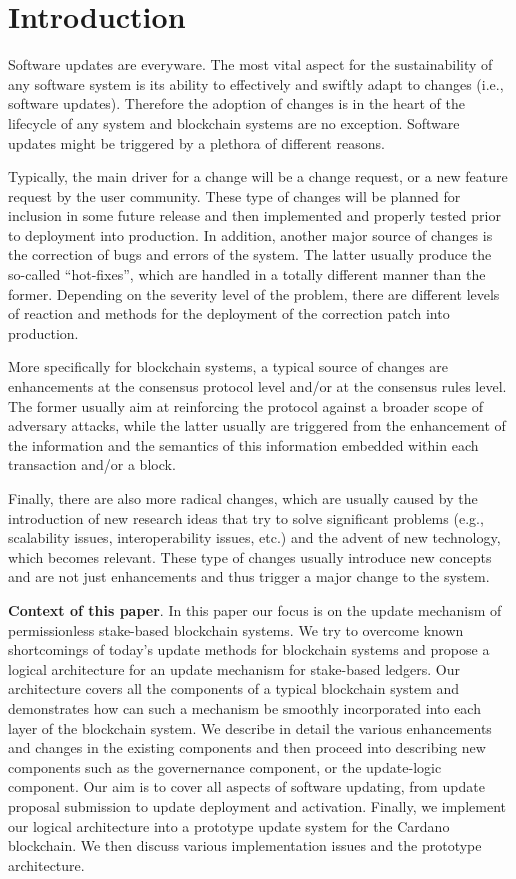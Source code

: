 \section{Introduction}
Software updates are everyware. The most vital aspect for the sustainability of any software system is its ability to effectively and swiftly adapt to changes (i.e., software updates). Therefore the adoption of changes is in the heart of the lifecycle of any system and blockchain systems are no exception. Software updates might be triggered by a plethora of different reasons. 

Typically, the main driver for a change will be a change request, or a new feature request by the user community. These type of changes will be planned for inclusion in some future release and then implemented and properly tested prior to deployment into production. In addition, another major source of changes is the correction of bugs and errors of the system. The latter usually produce the so-called \enquote{hot-fixes}, which are handled in a totally different manner than the former. Depending on the severity level of the problem, there are different levels of reaction and methods for the deployment of the correction patch into production. 

More specifically for blockchain systems, a typical source of changes are enhancements at the consensus protocol level and/or at the consensus rules level. The former usually aim at reinforcing the protocol against a broader scope of adversary attacks, while the latter usually are triggered from the enhancement of the information and the semantics of this information embedded within each transaction and/or a block. 

Finally, there are also more radical changes, which are usually caused by the introduction of new research ideas that try to solve significant problems (e.g., scalability issues, interoperability issues, etc.) and the advent of new technology, which becomes relevant. These type of changes usually introduce new concepts and are not just enhancements and thus trigger a major change to the system.

\noindent\textbf{Context of this paper}. In this paper our focus is on the update mechanism of permissionless stake-based blockchain systems. We try to overcome known shortcomings of today's update methods for blockchain systems and propose a logical architecture for an update mechanism for stake-based ledgers. Our architecture covers all the components of a typical blockchain system and demonstrates how can such a mechanism be smoothly incorporated into each layer of the blockchain system. We describe in detail the various enhancements and changes in the existing components and then proceed into describing new components such as the governernance component, or the update-logic component. Our aim is to cover all aspects of software updating, from update proposal submission to update deployment and activation. Finally, we implement our logical architecture into a prototype update system for the Cardano blockchain. We then discuss various implementation issues and the prototype architecture.

